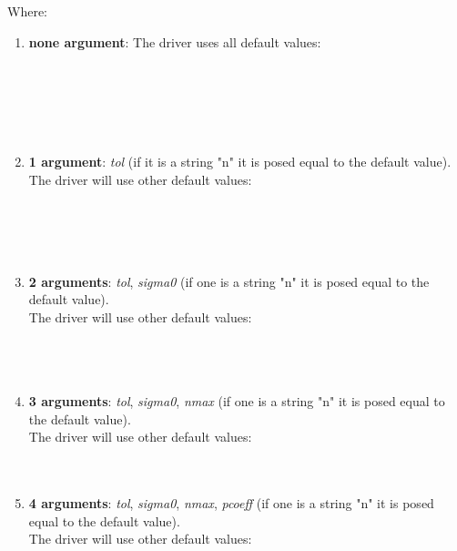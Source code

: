 \documentclass[10pt]{article}
\begin{document}
Where:
\begin{enumerate}
	  \item \textbf{none argument}: The driver uses all default values:\\
		   \\
		   \\
		   \\
		   \\
		   \\
		   

	  \item \textbf{1 argument}: \emph{tol} (if it is a string "n" it is posed equal to the default value). \\The driver will use other default values:\\
		  \\
		  \\
		  \\
		  \\

	  \item \textbf{2 arguments}: \emph{tol}, \emph{sigma0} (if one is a string "n" it is posed equal to the default value). \\The driver will use other default values:\\
		\\
		\\
		\\

	  \item \textbf{3 arguments}: \emph{tol}, \emph{sigma0}, \emph{nmax} (if one is a string "n" it is posed equal to the default value). \\The driver will use other default values:\\
		\\
		\\

	  \item \textbf{4 arguments}: \emph{tol}, \emph{sigma0}, \emph{nmax}, \emph{pcoeff} (if one is a string "n" it is posed equal to the default value). \\The driver will use other default values:\\
		\\


\end{enumerate}
\end{document}
